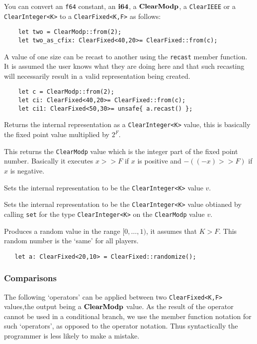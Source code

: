You can convert an \verb|f64| constant, an $\mathbf{i64}$,  a $\mathbf{ClearModp}$,
a \verb|ClearIEEE| or a \verb|ClearInteger<K>| to a \verb|ClearFixed<K,F>| as follows:
\begin{lstlisting}
    let two = ClearModp::from(2);
    let two_as_cfix: ClearFixed<40,20>= ClearFixed::from(c);
\end{lstlisting}

A value of one size can be recast to another using the \verb|recast|
member function. It is assumed the user knows what they are doing here
and that such recasting will necessarily result in a valid representation
being created.
\begin{lstlisting}
    let c = ClearModp::from(2);
    let ci: ClearFixed<40,20>= ClearFixed::from(c);
    let ci1: ClearFixed<50,30>= unsafe{ a.recast() };
\end{lstlisting}

Returns the internal representation as a \verb|ClearInteger<K>| value,
this is basically the fixed point value multiplied by $2^F$.

This returns the \verb|ClearModp| value which is the integer part
of the fixed point number.
Basically it executes $x >> F$ if $x$ is positive and
$-((-x)>>F)$ if $x$ is negative.

Sets the internal representation to be the \verb|ClearInteger<K>| value $v$.

Sets the internal representation to be the \verb|ClearInteger<K>| value obtianed by calling \verb|set| for the type
\verb|ClearInteger<K>| on the \verb|ClearModp| value $v$.


Produces a random value in the range $[0,\ldots,1)$, it
assumes that $K > F$.
This random number is the `same' for all players.
\begin{lstlisting}
   let a: ClearFixed<20,10> = ClearFixed::randomize();
\end{lstlisting}



\subsubsection{Comparisons}
The following `operators' can be applied between two \verb|ClearFixed<K,F>|
values,the output being a $\mathbf{ClearModp}$ value.
As the result of the operator cannot be used in a conditional branch,
we use the member function notation for such `operators', as opposed
to the operator notation. Thus syntactically the programmer is less
likely to make a mistake.


